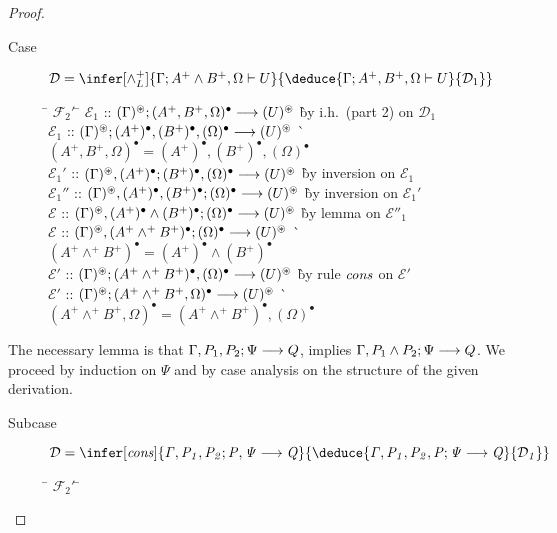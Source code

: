 \documentclass[acmtocl]{robtrans}\pdfoutput=1
\newcommand{\seq}[2]{{#1} \longrightarrow {#2} \mathstrut}
\newcommand{\ifoc}[3]{{#1}; {#2} \vdash {#3} \mathstrut}
\begin{document}
\begin{proof}
\begin{description}
\item[Case]
$\mathcal D = \infer[\wedge^+_L]
{\ifoc{\Gamma}{A^+ \wedge B^+, \Omega}{U}}
{\deduce{\ifoc{\Gamma}{A^+, B^+, \Omega}{U}}{\mathcal D_1}}$
\begin{tabbing}
\qquad \= $\mathcal F_2'$ \= \kill
\>
$\mathcal E_1$ \> :: $\seq{(\Gamma)^\circledast; (A^+, B^+, \Omega)^\bullet}{(U)^\circledast}$
 \` by i.h.~(part 2) on $\mathcal D_1$
\\
\>
$\mathcal E_1$ \> :: $\seq{(\Gamma)^\circledast; (A^+)^\bullet, (B^+)^\bullet, (\Omega)^\bullet}{(U)^\circledast}$
 \` $(A^+, B^+, \Omega)^\bullet = (A^+)^\bullet, (B^+)^\bullet, (\Omega)^\bullet$
\\
\>
$\mathcal E_1'$ \> :: $\seq{(\Gamma)^\circledast, (A^+)^\bullet; (B^+)^\bullet, (\Omega)^\bullet}{(U)^\circledast}$
 \` by inversion on $\mathcal E_1$ \\
\>
$\mathcal E_1''$ \> :: $\seq{(\Gamma)^\circledast, (A^+)^\bullet, (B^+)^\bullet; (\Omega)^\bullet}{(U)^\circledast}$
 \` by inversion on $\mathcal E_1'$ \\
\>
$\mathcal E$ \> :: $\seq{(\Gamma)^\circledast, (A^+)^\bullet \wedge (B^+)^\bullet; (\Omega)^\bullet}{(U)^\circledast}$
 \` by lemma on $\mathcal E''_1$
\\
\>
$\mathcal E$ \> :: $\seq{(\Gamma)^\circledast, (A^+ \wedge^+ B^+)^\bullet; (\Omega)^\bullet}{(U)^\circledast}$
 \` $(A^+  \wedge^+ B^+)^\bullet = (A^+)^\bullet \wedge (B^+)^\bullet$
\\
\>
$\mathcal E'$ \> :: $\seq{(\Gamma)^\circledast; (A^+ \wedge^+ B^+)^\bullet, (\Omega)^\bullet}{(U)^\circledast}$
 \` by rule $\it cons$ on $\mathcal E'$
\\
\>
$\mathcal E'$ \> :: $\seq{(\Gamma)^\circledast; (A^+ \wedge^+ B^+, \Omega)^\bullet}{(U)^\circledast}$
 \` $(A^+ \wedge^+ B^+, \Omega)^\bullet = (A^+ \wedge^+ B^+)^\bullet, (\Omega)^\bullet$
\end{tabbing}
\end{description}
The necessary lemma is that $\seq{\Gamma, P_1, P_2; \Psi}{Q}$,
implies $\seq{\Gamma, P_1 \wedge P_2; \Psi}{Q}$.
We proceed by induction on $\Psi$ and by case analysis on the
structure of the given derivation.
\begin{description}
\item[Subcase] $\mathcal D = 
\infer[\it cons]
{\seq{\Gamma, P_1, P_2; P, \Psi}{Q}}
{\deduce{\seq{\Gamma, P_1, P_2, P; \Psi}{Q}}{\mathcal D_1}}$
\begin{tabbing}
\qquad \= $\mathcal F_2'$ \= \kill

\end{tabbing}
\end{description}
\end{proof}
\end{document}
